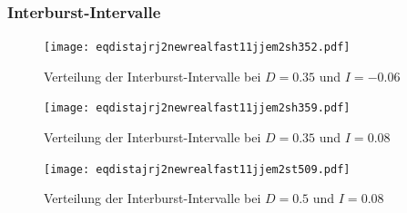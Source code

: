 \documentclass[12pt,a4paper]{article}
\begin{document}
\subsubsection{Interburst-Intervalle}
\begin{figure}[H]
	\centering
	\texttt{[image: eqdistajrj2newrealfast11jjem2sh352.pdf]}\caption{Verteilung der Interburst-Intervalle bei $D=0.35$ und $I=-0.06$}
	\label{hist35bad}
\end{figure}
\begin{figure}[H]
	\centering
	\texttt{[image: eqdistajrj2newrealfast11jjem2sh359.pdf]}\caption{Verteilung der Interburst-Intervalle bei $D=0.35$ und $I=0.08$}
	\label{hist35}
\end{figure}
\begin{figure}[H]
	\centering
	\texttt{[image: eqdistajrj2newrealfast11jjem2st509.pdf]}\caption{Verteilung der Interburst-Intervalle bei $D=0.5$ und $I=0.08$}
	\label{hist50}
\end{figure}
\end{document}
